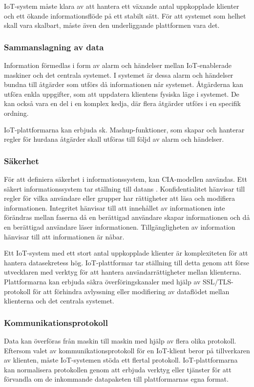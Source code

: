 IoT-system måste klara av att hantera ett växande antal uppkopplade klienter
och ett ökande informationsflöde på ett stabilt sätt. För att systemet som
helhet skall vara skalbart, måste även den underliggande plattformen vara det.

\subsubsection{Sammanslagning av data}
Information förmedlas i form av alarm och händelser mellan IoT-enablerade
maskiner och det centrala systemet. I systemet är dessa alarm och händelser
bundna till åtgärder som utförs då informationen når systemet. Åtgärderna
kan utföra enkla uppgifter, som att uppdatera klientens fysiska läge
i systemet. De kan också vara en del i en komplex kedja, där flera åtgärder
utförs i en specifik ordning.

IoT-plattformarna kan erbjuda sk. Mashup-funktioner, som skapar och hanterar
regler för hurdana åtgärder skall utföras till följd av alarm och händelser.
\cite{mashup_def} 

\subsubsection{Säkerhet}
För att definiera säkerhet i informationssystem, kan CIA-modellen användas.
Ett säkert informationssystem tar ställning till datans 
. Konfidentialitet
hänvisar till regler för vilka användare eller grupper har rättigheter
att läsa och modifiera informationen. Integritet hänvisar till att innehållet
av informationen inte förändras mellan faserna då en berättigad användare skapar
informationen och då en berättigad användare läser informationen.
Tillgängligheten av information hänvisar till att informationen är nåbar.

Ett IoT-system med ett stort antal uppkopplade klienter är komplexiteten
för att hantera datasekretess hög. IoT-plattformar tar ställning till detta
genom att förse utvecklaren med verktyg för att hantera användarrättigheter
mellan klienterna. Plattformarna kan erbjuda säkra överföringskanaler
med hjälp av SSL/TLS-protokoll  för att 
förhindra avlyssning eller modifiering av dataflödet mellan klienterna och det
centrala systemet.

\subsubsection{Kommunikationsprotokoll}
Data kan överföras från maskin till maskin med hjälp av flera olika protokoll.
Eftersom valet av kommunikationsprotokoll för en IoT-klient beror på
tillverkaren av klienten, måste IoT-systemen stöda ett flertal protokoll.
IoT-plattformarna kan normalisera protokollen genom att erbjuda verktyg eller
tjänster för att förvandla om de inkommande datapaketen till plattformarnas
egna format.



